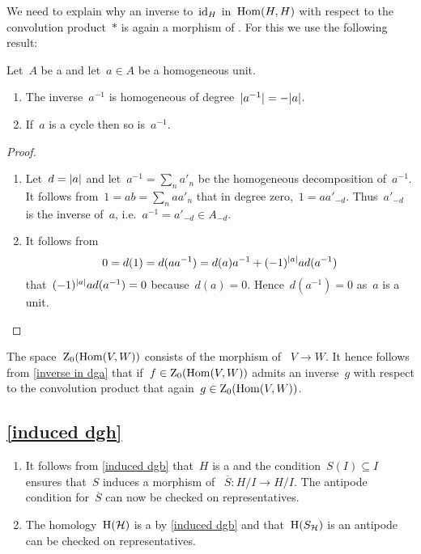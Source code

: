 We need to explain why an inverse to~$\operatorname{id}_H$ in~$\operatorname{Hom}(H,H)$ with respect to the convolution product~$*$ is again a  morphism of {\dgvs}.
For this we use the following result:

\begin{lemma}
  \label{inverse in dga}
  Let~$A$ be a {\dga} and let~$a \in A$ be a homogeneous unit.
  \begin{enumerate}
    \item
      The inverse~$a^{-1}$ is homogeneous of degree~$\lvert a^{-1}\rvert = - \lvert a\rvert$.
    \item
      If~$a$ is a cycle then so is~$a^{-1}$.
  \end{enumerate}
\end{lemma}

\begin{proof}
  \leavevmode
  \begin{enumerate}
    \item
      Let~$d = \lvert a\rvert$ and let~$a^{-1} = \sum_n a'_n$ be the homogeneous decomposition of~$a^{-1}$.
      It follows from~$1 = ab = \sum_n a a'_n$ that in degree zero,~$1 = a a'_{-d}$.
      Thus~$a'_{-d}$ is the inverse of~$a$, i.e.~$a^{-1} = a'_{-d} \in A_{-d}$.
    \item
      It follows from
      \[
        0
        =
        d(1)
        =
        d(a a^{-1})
        =
        d(a) a^{-1}
        +
        (-1)^{\lvert a\rvert} a d(a^{-1})
      \]
      that~$(-1)^{\lvert a\rvert} a d(a^{-1}) = 0$ because~$d(a) = 0$.
      Hence~$d(a^{-1}) = 0$ as~$a$ is a unit.
    \qedhere
  \end{enumerate}
\end{proof}

The space~$\operatorname{Z}_0(\operatorname{Hom}(V,W))$ consists of the morphism of {\dgvs}~$V \to W$.
It hence follows from \cref{inverse in dga} that if~$f \in \operatorname{Z}_0(\operatorname{Hom}(V,W))$ admits an inverse~$g$ with respect to the convolution product that again~$g \in \operatorname{Z}_0(\operatorname{Hom}(V,W))$.





\subsection{\cref{induced dgh}}
\label{induced dgh proof}
\begin{enumerate}
  \item
    It follows from \cref{induced dgb} that~$H$ is a {\dgb} and the condition~$S(I) \subseteq I$ ensures that~$S$ induces a morphism of {\dgvs}~$\overline{S} \colon H/I \to H/I$.
    The antipode condition for~$\overline{S}$ can now be checked on representatives.
  \item
    The homology~$\operatorname{H}(\mathcal{H})$ is a {\dgb} by \cref{induced dgb} and that~$\operatorname{H}(S_{\mathcal{H}})$ is an antipode can be checked on representatives.
\end{enumerate}






